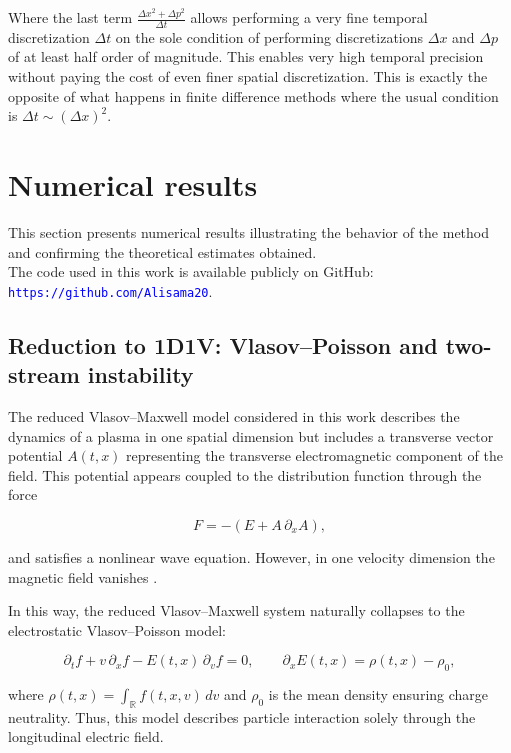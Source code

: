 \documentclass[11pt,a4paper,twoside,pdf]{article}
\numberwithin{equation}{section}
\begin{document}
Where the last term $\frac{\Delta x^2 + \Delta p^2}{\Delta t}$ allows performing a very fine temporal discretization $\Delta t$ on the sole condition of performing discretizations $\Delta x$ and $\Delta p$ of at least half order of magnitude. This enables very high temporal precision without paying the cost of even finer spatial discretization. This is exactly the opposite of what happens in finite difference methods where the usual condition is $\Delta t \sim \left( \Delta x \right)^2$.




\section{Numerical results}

This section presents numerical results illustrating the behavior of the method and confirming the theoretical estimates obtained.\\

The code used in this work is available publicly on GitHub: \textcolor{blue}{\texttt{https://github.com/Alisama20}}.



\subsection{Reduction to 1D1V: Vlasov--Poisson and two-stream instability}



The reduced Vlasov--Maxwell model considered in this work describes the dynamics of a plasma in one spatial dimension but includes a transverse vector potential $A(t,x)$ representing the transverse electromagnetic component of the field. This potential appears coupled to the distribution function through the force


\[
F = -\left(E + A\,\partial_x A\right),
\]


and satisfies a nonlinear wave equation. However, in one velocity dimension the magnetic field vanishes \cite{martin2021campo}.

In this way, the reduced Vlasov--Maxwell system naturally collapses to the electrostatic Vlasov--Poisson model:


\[
\partial_t f + v\,\partial_x f - E(t,x)\,\partial_v f = 0,
\qquad
\partial_x E(t,x) = \rho(t,x) - \rho_0,
\]


where $\rho(t,x)=\int_{\mathbb{R}} f(t,x,v)\,dv$ and $\rho_0$ is the mean density ensuring charge neutrality. Thus, this model describes particle interaction solely through the longitudinal electric field.\\
\end{document}
